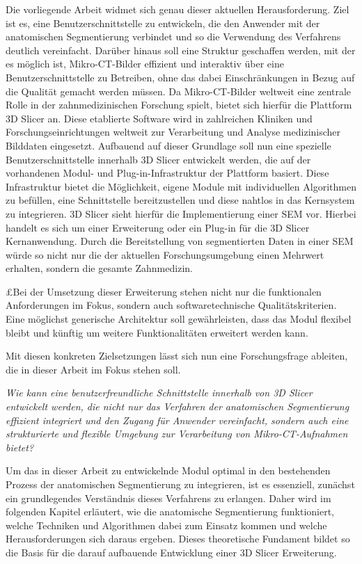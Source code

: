 Die vorliegende Arbeit widmet sich genau dieser aktuellen Herausforderung. Ziel ist
es, eine Benutzerschnittstelle zu entwickeln, die den Anwender mit der anatomischen
Segmentierung verbindet und so die Verwendung des Verfahrens deutlich vereinfacht.
Darüber hinaus soll eine Struktur geschaffen werden, mit der es möglich ist,
Mikro-\ac{CT}-Bilder effizient und interaktiv über eine Benutzerschnittstelle zu
Betreiben, ohne das dabei Einschränkungen in Bezug auf die Qualität gemacht
werden müssen. Da Mikro-\ac{CT}-Bilder weltweit eine zentrale Rolle in der
zahnmedizinischen Forschung spielt, bietet sich hierfür die Plattform 3D Slicer an.
Diese etablierte Software wird in zahlreichen Kliniken und
Forschungseinrichtungen weltweit zur Verarbeitung und Analyse medizinischer
Bilddaten eingesetzt. Aufbauend auf dieser Grundlage soll nun eine spezielle Benutzerschnittstelle
innerhalb 3D Slicer entwickelt werden, die auf der vorhandenen Modul- und Plug-in-Infrastruktur
der Plattform basiert. Diese Infrastruktur bietet die Möglichkeit, eigene Module
mit individuellen Algorithmen zu befüllen, eine Schnittstelle bereitzustellen
und diese nahtlos in das Kernsystem zu integrieren. 3D Slicer sieht hierfür die Implementierung
einer \ac{SEM} vor. Hierbei handelt es sich um einer Erweiterung oder ein Plug-in
für die 3D Slicer Kernanwendung. Durch die Bereitstellung von segmentierten
Daten in einer \ac{SEM} würde so nicht nur die der aktuellen Forschungsumgebung einen
Mehrwert erhalten, sondern die gesamte Zahnmedizin.

£Bei der Umsetzung dieser Erweiterung stehen nicht nur die funktionalen
Anforderungen im Fokus, sondern auch softwaretechnische Qualitätskriterien. Eine
möglichst generische Architektur soll gewährleisten, dass das Modul flexibel bleibt
und künftig um weitere Funktionalitäten erweitert werden kann.

Mit diesen konkreten Zielsetzungen lässt sich nun eine Forschungsfrage ableiten,
die in dieser Arbeit im Fokus stehen soll.

\begin{center}
	\textit{Wie kann eine benutzerfreundliche Schnittstelle innerhalb von 3D
	Slicer entwickelt werden, die nicht nur das Verfahren der anatomischen Segmentierung
	effizient integriert und den Zugang für Anwender vereinfacht, sondern auch
	eine strukturierte und flexible Umgebung zur Verarbeitung von Mikro-\ac{CT}-Aufnahmen
	bietet?}
\end{center}

Um das in dieser Arbeit zu entwickelnde Modul optimal in den bestehenden Prozess
der anatomischen Segmentierung zu integrieren, ist es essenziell, zunächst ein grundlegendes
Verständnis dieses Verfahrens zu erlangen. Daher wird im folgenden Kapitel
erläutert, wie die anatomische Segmentierung funktioniert, welche Techniken und
Algorithmen dabei zum Einsatz kommen und welche Herausforderungen sich daraus
ergeben. Dieses theoretische Fundament bildet so die Basis für die darauf aufbauende
Entwicklung einer 3D Slicer Erweiterung.
